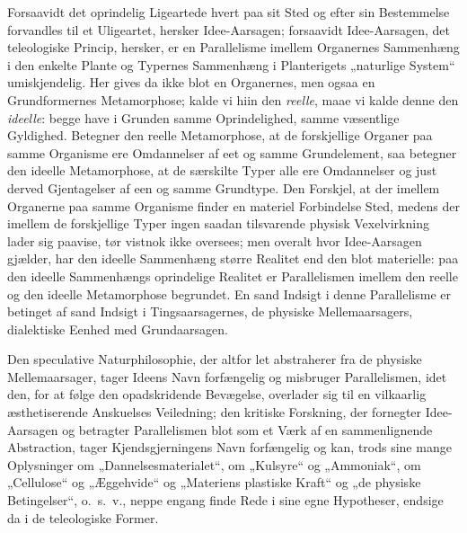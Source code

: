 \documentclass[11pt]{book}
\newcommand{\opage}[1]{\marginnote{\footnotesize\textit{[#1]}}}
\begin{document}
Forsaavidt det oprindelig Ligeartede hvert paa sit Sted og efter sin
Bestemmelse forvandles til et Uligeartet, hersker Idee-Aarsagen; forsaavidt
Idee-Aarsagen, det teleologiske Princip, hersker, er en Parallelisme imellem
Organernes Sammenhæng i den enkelte Plante og Typernes Sammenhæng i
Planterigets „naturlige System“ umiskjendelig. Her gives da ikke blot en
Organernes, men ogsaa en Grundformernes
\opage{306} \setcounter{footnote}{0}%
Metamorphose; kalde vi hiin den \emph{reelle}, maae vi kalde denne den
\emph{ideelle}: begge have i Grunden samme Oprindelighed, samme væsentlige
Gyldighed. Betegner den reelle Metamorphose, at de forskjellige Organer paa
samme Organisme ere Omdannelser af eet og samme Grundelement, saa betegner
den ideelle Metamorphose, at de særskilte Typer alle ere Omdannelser og just
derved Gjentagelser af een og samme Grundtype. Den Forskjel, at der imellem
Organerne paa samme Organisme finder en materiel Forbindelse Sted, medens
der imellem de forskjellige Typer ingen saadan tilsvarende physisk
Vexelvirkning lader sig paavise, tør vistnok ikke oversees; men overalt hvor
Idee-Aarsagen gjælder, har den ideelle Sammenhæng større Realitet end den
blot materielle: paa den ideelle Sammenhængs oprindelige Realitet er
Parallelismen imellem den reelle og den ideelle Metamorphose begrundet. En
sand Indsigt i denne Parallelisme er betinget af sand Indsigt i
Tingsaarsagernes, de physiske Mellemaarsagers, dialektiske Eenhed med
Grundaarsagen.

Den speculative Naturphilosophie, der altfor let abstraherer fra de physiske
Mellemaarsager, tager Ideens Navn forfængelig og misbruger Parallelismen,
idet den, for at følge den opadskridende Bevægelse, overlader sig til en
vilkaarlig æsthetiserende Anskuelses Veiledning; den kritiske Forskning, der
fornegter Idee-Aarsagen og betragter Parallelismen blot som et Værk af en
sammenlignende Abstraction, tager Kjendsgjerningens Navn forfængelig og kan,
trods sine mange Oplysninger om „Dannelsesmaterialet“, om „Kulsyre“ og
„Ammoniak“, om „Cellulose“ og „Æggehvide“ og „Materiens plastiske Kraft“ og
„de physiske Betingelser“, o.~s.~v., neppe engang finde Rede i sine egne
Hypotheser, endsige da i de teleologiske Former.
\end{document}
